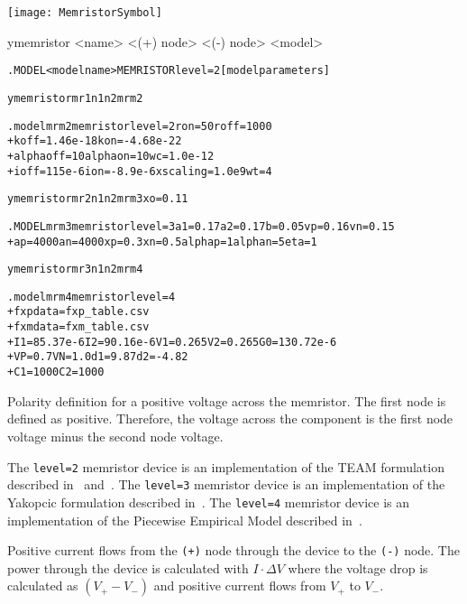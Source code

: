 


\begin{Device}

\symbol
{\texttt{[image: MemristorSymbol]}}

\device
ymemristor <name> <(+) node> <(-) node> <model>

\model
\begin{alltt}
.MODEL <model name> MEMRISTOR level=2 [model parameters]
\end{alltt}

\examples
\begin{alltt}

ymemristor mr1 n1 n2 mrm2

.model mrm2 memristor level=2 ron=50 roff=1000 
+ koff=1.46e-18 kon=-4.68e-22 
+ alphaoff=10 alphaon=10 wc=1.0e-12 
+ ioff=115e-6 ion=-8.9e-6 xscaling=1.0e9 wt=4


ymemristor mr2 n1 n2 mrm3 xo=0.11 

.MODEL mrm3 memristor level=3 a1=0.17 a2=0.17 b=0.05 vp=0.16 vn=0.15 
+ ap=4000 an=4000 xp=0.3 xn=0.5 alphap=1 alphan=5 eta=1 


ymemristor mr3 n1 n2 mrm4 

.model mrm4 memristor level=4 
+ fxpdata=fxp_table.csv
+ fxmdata=fxm_table.csv
+ I1=85.37e-6 I2=90.16e-6 V1=0.265 V2=0.265 G0=130.72e-6
+ VP=0.7 VN=1.0 d1=9.87 d2=-4.82
+ C1=1000 C2=1000

\end{alltt}

\parameters

\begin{Parameters}

Polarity definition for a positive voltage across the memristor. The
first node is defined as positive. Therefore, the voltage across the
component is the first node voltage minus the second node voltage.


\end{Parameters}

\comments
The {\tt level=2} memristor device is an implementation of the TEAM formulation described 
in~\cite{KvatinskyFriedman2012} and~\cite{KvatinskyFriedman2013}.
The {\tt level=3}  memristor device is an implementation of the Yakopcic formulation described 
in~\cite{ChrisYakopcic2013}. The {\tt level=4} memristor device is an implementation of the 
Piecewise Empirical Model described in~\cite{Niroula2017}.

Positive current flows from
the \texttt{(+)} node through the device to the \texttt{(-)}
node. The power through the device is calculated 
with $I \cdot \Delta V$ where the voltage drop is calculated as $(V_+ - V_-)$ 
and positive current flows from $V_+$ to $V_-$.  
\end{Device}

